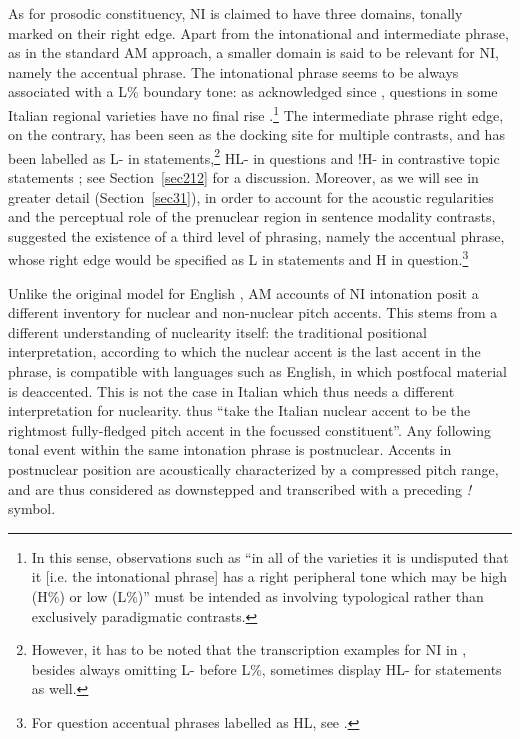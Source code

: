 As for prosodic constituency, NI is claimed to have three domains, tonally marked on their right edge. Apart from the intonational and intermediate phrase, as in the standard AM approach, a smaller domain is said to be relevant for NI, namely the accentual phrase. The intonational phrase seems to be always associated with a L\% boundary tone: as acknowledged since \citet{grice1991intonation}, questions in some Italian regional varieties have no final rise \citep{savino2012intonation}.\footnote{In this sense, observations such as ``in all of the varieties it is undisputed that it [i.e. the intonational phrase] has a right peripheral tone which may be high (H\%) or low (L\%)'' \cite[373]{grice2005strategy} must be intended as involving typological rather than exclusively paradigmatic contrasts.} The intermediate phrase right edge, on the contrary, has been seen as the docking site for multiple contrasts, and has been labelled as L- in statements,\footnote{However, it has to be noted that the transcription examples for NI in \citet{grice2005strategy}, besides always omitting L- before L\%, sometimes display HL- for statements as well.} HL- in questions \citep{dimperio2001focus} and !H- in contrastive topic statements \citep{dimperio2011phrasing}; see Section~\ref{sec212} for a discussion. Moreover, as we will see in greater detail (Section~\ref{sec31}), in order to account for the acoustic regularities and the perceptual role of the prenuclear region in sentence modality contrasts, \citet{petrone2011tones} suggested the existence of a third level of phrasing, namely the accentual phrase, whose right edge would be specified as L in statements and H in question.\footnote{For question accentual phrases labelled as HL, see \citet{petrone2008tonal}.}

Unlike the original model for English \citep{pierrehumbert1980phonology}, AM accounts of NI intonation posit a different inventory for nuclear and non-nuclear pitch accents. This stems from a different understanding of nuclearity itself: the traditional positional interpretation, according to which the nuclear accent is the last accent in the phrase, is compatible with languages such as English, in which postfocal material is deaccented. This is not the case in Italian \citep{swerts1999reaccentuation} which thus needs a different interpretation for nuclearity. \citet[380]{grice2005strategy} thus ``take the Italian nuclear accent to be the rightmost fully-fledged pitch accent in the focussed constituent''. Any following tonal event within the same intonation phrase is postnuclear. Accents in postnuclear position are acoustically characterized by a compressed pitch range, and are thus considered as downstepped and transcribed with a preceding \textit{!} symbol.

